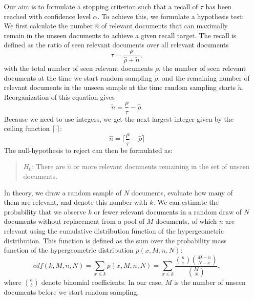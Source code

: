 \documentclass{bmcart}
\begin{document}
	Our aim is to formulate a stopping criterion such that a recall of $\tau$ has been reached with confidence level $\alpha$.
	To achieve this, we formulate a hypothesis test:
	We first calculate the number $\hat{n}$ of relevant documents that can maximally remain in the unseen documents to achieve a given recall target. The recall is defined as the ratio of seen relevant documents over all relevant documents
	\begin{equation}
		\tau = \frac{\rho}{\hat{\rho} + \tilde{n}},
	\end{equation}
	with the total number of seen relevant documents $\rho$, the number of seen relevant documents at the time we start random sampling $\hat{\rho}$, and the remaining number of relevant documents in the unseen sample at the time random sampling starts $\tilde{n}$.
	Reorganization of this equation gives
	\begin{equation}
		\tilde{n} = \frac{\rho}{\tau} - \hat{\rho}.
	\end{equation}
	Because we need to use integers, we get the next largest integer given by the ceiling function $\lceil \cdot \rceil$:
	\begin{equation}
		\hat{n} = \lceil \frac{\rho}{\tau} - \hat{\rho} \rceil
	\end{equation}
	The null-hypothesis to reject can then be formulated as:
	\begin{quote}
	$H_0$: There are $\hat{n}$ or more relevant documents remaining in the set of unseen documents.
	\end{quote}
	
	
	In theory, we draw a random sample of $N$ documents, evaluate how many of them are relevant, and denote this number with $k$. We can estimate the probability that we observe $k$ or fewer relevant documents in a random draw of $N$ documents without replacement from a pool of $M$ documents, of which $n$ are relevant using the cumulative distribution function of the hypergeometric distribution.
This function is defined as the sum over the probability mass function of the hypergeometric distribution $p(x, M, n, N)$:
	\begin{equation}	
		 cdf(k, M, n, N) = \sum_{x \leq k} p(x, M, n, N) = \sum_{x \leq k} \frac{\binom{n}{x} \binom{M - n}{N - x}} {\binom{M}{N}},
		 \label{pfunc}
	\end{equation}
	where $\binom{a}{b}$ denote binomial coefficients. In our case, $M$ is the number of unseen documents before we start random sampling.
	
\end{document}
